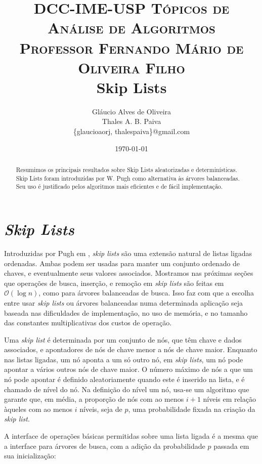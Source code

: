 \documentclass[paper=a4, fontsize=11pt]{scrartcl} %
\title{	
\normalfont \normalsize 
\textsc{DCC-IME-USP Tópicos de Análise de Algoritmos \\ Professor Fernando Mário de Oliveira Filho} \\ [25pt]
\huge Skip Lists%
}
\author{Gláucio Alves de Oliveira \\ Thales A. B. Paiva 
        \\ \small \{glaucioaorj, thalespaiva\}@gmail.com}
\date{\normalsize\today}
\numberwithin{equation}{section}
\numberwithin{figure}{section}
\numberwithin{table}{section}
\numberwithin{definition}{section}
\numberwithin{theorem}{section}
\numberwithin{property}{section}
\numberwithin{proposition}{section}
\newcommand{\horrule}[1]{\rule{\linewidth}{#1}} %
\newcommand{\cO}{\ensuremath{\mathcal{O}}}
\newcommand{\SLs}{\textit{Skip Lists}\space}
\newcommand{\sls}{\textit{skip lists}\xspace}
\renewcommand{\sl}{\textit{skip list}\xspace}
\begin{document}
\maketitle %

\begin{abstract} \noindent

Resumimos os principais resultados sobre Skip Lists aleatorizadas e determinísticas. 
Skip Lists foram introduzidas por W. Pugh como alternativa às árvores balanceadas. 
Seu uso é justificado pelos algoritmos mais eficientes e de fácil implementação.

\end{abstract}

\tableofcontents

\pagebreak
\section{\SLs}
\FloatBarrier

Introduzidas por Pugh em \cite{pugh}, \sls são uma extensão natural de listas ligadas ordenadas. 
Ambas podem ser usadas para manter um conjunto ordenado de chaves, e eventualmente seus valores associados.
Mostramos nas próximas seções que operações de busca, inserção, e remoção em \sls são feitas em $\cO(\log n)$, 
como para árvores balanceadas de busca. Isso faz com que a escolha entre usar \sls ou árvores balanceadas numa
determinada aplicação seja baseada nas dificuldades de implementação, no uso de memória, e no tamanho das 
constantes multiplicativas dos custos de operação. 

Uma \sl é determinada por um conjunto de nós, que têm chave e dados associados, e apontadores de nós de chave 
menor a nós de chave maior.
Enquanto nas listas ligadas, um nó aponta a um só outro nó, em \sls, um nó pode apontar a vários 
outros nós de chave maior. 
O número máximo de nós a que um nó pode apontar é definido aleatoriamente quando este é inserido na lista, e 
é chamado de nível do nó. Na definição do nível um nó, usa-se um algoritmo que garante que, em média, a proporção 
de nós com ao menos $i + 1$ níveis em relação àqueles com ao menos $i$ níveis, seja de $p$, uma probabilidade
fixada na criação da \sl.

A interface de operações básicas permitidas sobre uma lista ligada é a mesma que a interface
para árvores de busca, com a adição da probabilidade $p$ passada em sua inicialização:
\end{document}
